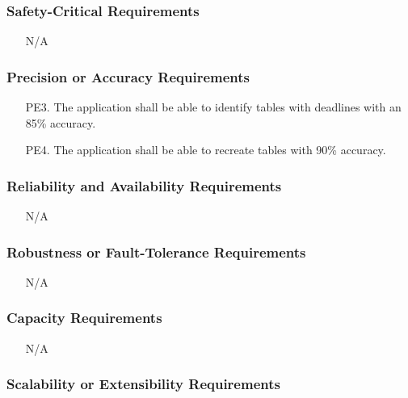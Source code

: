 \documentclass[12pt, titlepage]{article}
\begin{document}
\subsubsection{ Safety-Critical Requirements}

\begin{itemize}
  \item[] N/A
\end{itemize}

\subsubsection{ Precision or Accuracy Requirements}

\begin{itemize}
  \item[PE3.] The application shall be able to identify tables with deadlines with an 85\% accuracy.
  \item[PE4.] The application shall be able to recreate tables with 90\% accuracy.
\end{itemize}

\subsubsection{ Reliability and Availability Requirements }

\begin{itemize}
  \item[] N/A
\end{itemize}

\subsubsection{ Robustness or Fault-Tolerance Requirements}

\begin{itemize}
  \item[] N/A
\end{itemize}

\subsubsection{ Capacity Requirements}

\begin{itemize}
  \item[] N/A
\end{itemize}

\subsubsection{ Scalability or Extensibility Requirements}
\end{document}
